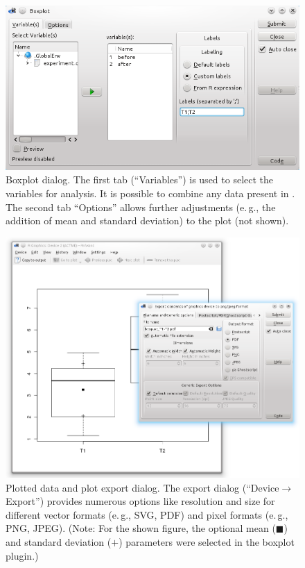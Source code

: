 \begin{figure}[htp]
 \centering
 \includegraphics[width=15.5cm]{../figures/boxplot1.png}
 \caption{Boxplot dialog. The first tab (``Variables'') is used to select the variables for analysis. It is possible to
  combine any data present in . The second tab ``Options'' allows further adjustments (e.\,g., the addition of mean and standard deviation) to the plot (not shown).}
 \label{fig:boxplot1}
\end{figure}


\begin{figure}[htp]
 \centering
 \includegraphics[width=15.5cm]{../figures/boxplot2.png}
 \caption{Plotted data and plot export dialog. The export dialog (``Device$\rightarrow$Export'') provides numerous 
  options like resolution and size for different vector formats (e.\,g., SVG, PDF) and 
  pixel formats (e.\,g., PNG, JPEG). (Note: For the shown figure, the optional  
  mean ($\blacksquare$) and standard deviation ($+$) parameters were selected in the boxplot plugin.)}
 \label{fig:boxplot2}
\end{figure}
